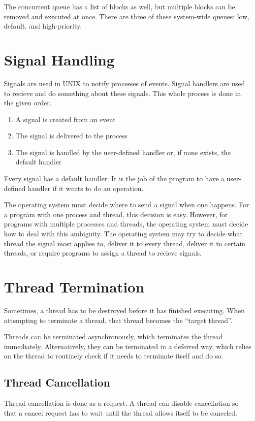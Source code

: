 \documentclass{article}
\begin{document}
The concurrent queue has a list of blocks as well, but multiple blocks can be
removed and executed at once. There are three of these system-wide queues: low,
default, and high-priority.

\section{Signal Handling}
Signals are used in UNIX to notify processes of events. Signal handlers are
used to recieve and do something about these signals. This whole process is
done in the given order.

\begin{enumerate}
	\item A signal is created from an event
	\item The signal is delivered to the process
	\item The signal is handled by the user-defined handler or, if none exists,
		the default handler
\end{enumerate}

Every signal has a default handler. It is the job of the program to have a
user-defined handler if it wants to do an operation.

The operating system must decide where to send a signal when one happens. For a
program with one process and thread, this decision is easy. However, for
programs with multiple processes and threads, the operating system must decide
how to deal with this ambiguity. The operating system may try to decide what
thread the signal most applies to, deliver it to every thread, deliver it to
certain threads, or require programs to assign a thread to recieve signals.

\section{Thread Termination}
Sometimes, a thread has to be destroyed before it has finished executing. When
attempting to terminate a thread, that thread becomes the ``target thread''.

Threads can be terminated asynchronously, which terminates the thread
immediately. Alternatively, they can be terminated in a deferred way, which
relies on the thread to routinely check if it needs to terminate itself and do
so.

\subsection{Thread Cancellation}
Thread cancellation is done as a request. A thread can disable cancellation so
that a cancel request has to wait until the thread allows itself to be
canceled.
\end{document}
